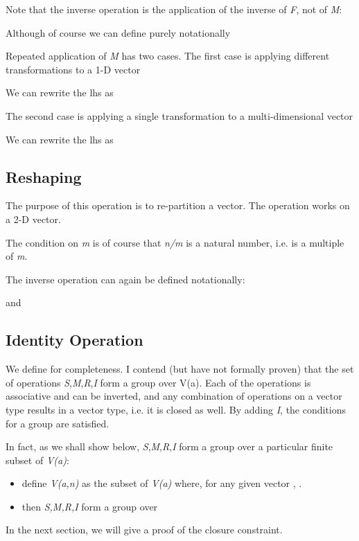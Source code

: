 \documentclass{article}
\begin{document}
Note that the inverse operation is the application of the inverse
of \emph{F}, not of \emph{M}:



Although of course we can define purely notationally



Repeated application of \emph{M} has two cases. The first case is
applying different transformations to a 1-D vector



We can rewrite the lhs as



The second case is applying a single transformation to a multi-dimensional
vector



We can rewrite the lhs as




\subsection{Reshaping}

The purpose of this operation is to re-partition a vector. The operation
works on a 2-D vector.



The condition on \emph{m} is of course that \emph{n/m} is a natural
number, i.e.  is a multiple of \emph{m}.

The inverse operation can again be defined notationally:



and




\subsection{Identity Operation}

We define  for
completeness. I contend (but have not formally proven) that the set
of operations \emph{S},\emph{M},\emph{R},\emph{I} form a group over
V(a). Each of the operations is associative and can be inverted, and
any combination of operations on a vector type results in a vector
type, i.e. it is closed as well. By adding \emph{I}, the conditions
for a group are satisfied.

In fact, as we shall show below, \emph{S},\emph{M},\emph{R},\emph{I}
form a group over a particular finite subset of \emph{V(a)}: 
\begin{itemize}
\item define \emph{V(a,n)} as the subset of \emph{V(a)} where, for any given
vector ,
.
\item then \emph{S,M,R,I} form a group over 
\end{itemize}
In the next section, we will give a proof of the closure constraint.
\end{document}
